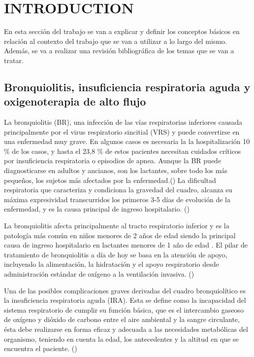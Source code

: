 \section{INTRODUCTION} \label{sec:itroduction}

En esta sección del trabajo se van a explicar y definir los conceptos básicos en relación al contexto del trabajo que se van a utilizar a lo largo del mismo. Además, se va a realizar una revisión bibliográfica de los temas que se van a tratar.

\subsection{Bronquiolitis, insuficiencia respiratoria aguda y oxigenoterapia de alto flujo}

La bronquiolitis (BR), una infección de las vías respiratorias inferiores causada principalmente por el virus respiratorio sincitial (VRS) y puede convertirse en una enfermedad muy grave. En algunos casos es necesaria la la hospitalización 10 \% de los casos, y hasta el 23,8 \% de estos pacientes necesitan cuidados críticos por insuficiencia respiratoria o episodios de apnea. Aunque la BR puede diagnosticarse en adultos y ancianos, son los lactantes, sobre todo los más pequeños, los sujetos más afectados por la enfermedad.(\cite{Fainardi2021}) La dificultad respiratoria que caracteriza y condiciona la gravedad del cuadro, alcanza su máxima expresividad transcurridos los primeros 3-5 días de evolución de la enfermedad, y es la causa principal de ingreso hospitalario. (\cite{Patel2003})

La bronquiolitis afecta principalmente al tracto respiratorio inferior y es la patología más común en niños menores de 2 años de edad siendo la principal causa de ingreso hospitalario en lactantes menores de 1 año de edad . El pilar de tratamiento de bronquiolitis a día de hoy se basa en la atención de apoyo, incluyendo la alimentación, la hidratación y el apoyo respiratorio desde administración estándar de oxígeno a la ventilación invasiva. (\cite{Daverio2019})

Una de las posibles complicaciones graves derivadas del cuadro bronquiolítico es la insuficiencia respiratoria aguda (IRA). Esta se define como la incapacidad del sistema respiratorio de cumplir su función básica, que es el intercambio gaseoso de oxígeno y dióxido de carbono entre el aire ambiental y la sangre circulante, ésta debe realizarse en forma eficaz y adecuada a las necesidades metabólicas del organismo, teniendo en cuenta la edad, los antecedentes y la altitud en que se encuentra el paciente. (\cite{FernandoR2010})  

